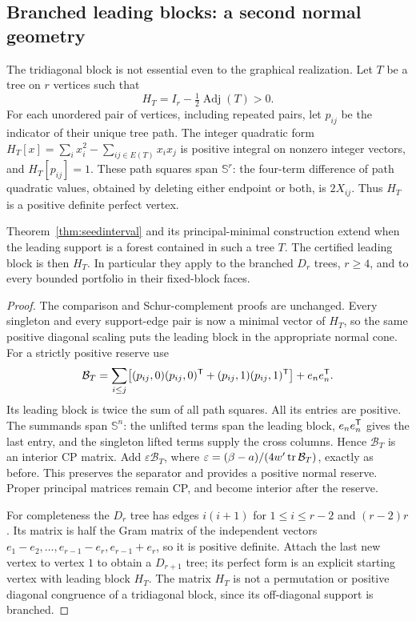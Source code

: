 \subsection{Branched leading blocks: a second normal geometry}
The tridiagonal block is not essential even to the graphical realization. Let $T$ be a tree on $r$ vertices such that
\[
 H_T=I_r-\tfrac12\operatorname{Adj}(T)>0.
\]
For each unordered pair of vertices, including repeated pairs, let $p_{ij}$ be the indicator of their unique tree path. The integer quadratic form $H_T[x]=\sum_i x_i^2-\sum_{ij\in E(T)}x_ix_j$ is positive integral on nonzero integer vectors, and $H_T[p_{ij}]=1$. These path squares span $\mathbb S^r$: the four-term difference of path quadratic values, obtained by deleting either endpoint or both, is $2X_{ij}$. Thus $H_T$ is a positive definite perfect vertex.

\begin{proposition}\label{prop:tree}
Theorem~\ref{thm:seedinterval} and its principal-minimal construction extend when the leading support is a forest contained in such a tree $T$. The certified leading block is then $H_T$. In particular they apply to the branched $D_r$ trees, $r\ge4$, and to every bounded portfolio in their fixed-block faces.
\end{proposition}
\begin{proof}
The comparison and Schur-complement proofs are unchanged. Every singleton and every support-edge pair is now a minimal vector of $H_T$, so the same positive diagonal scaling puts the leading block in the appropriate normal cone. For a strictly positive reserve use
\[
 \mathcal B_T=
 \sum_{i\le j}\bigl[(p_{ij},0)(p_{ij},0)^{\mathsf T}+
                       (p_{ij},1)(p_{ij},1)^{\mathsf T}\bigr]+e_ne_n^{\mathsf T}.
\]
Its leading block is twice the sum of all path squares. All its entries are positive. The summands span $\mathbb S^n$: the unlifted terms span the leading block, $e_ne_n^{\mathsf T}$ gives the last entry, and the singleton lifted terms supply the cross columns. Hence $\mathcal B_T$ is an interior CP matrix. Add $\varepsilon\mathcal B_T$, where $\varepsilon=(\beta-a)/(4w'\operatorname{tr}\mathcal B_T)$, exactly as before. This preserves the separator and provides a positive normal reserve. Proper principal matrices remain CP, and become interior after the reserve.

For completeness the $D_r$ tree has edges $i(i+1)$ for $1\le i\le r-2$ and $(r-2)r$. Its matrix is half the Gram matrix of the independent vectors
$e_1-e_2,\ldots,e_{r-1}-e_r,e_{r-1}+e_r$, so it is positive definite. Attach the last new vertex to vertex $1$ to obtain a $D_{r+1}$ tree; its perfect form is an explicit starting vertex with leading block $H_T$. The matrix $H_T$ is not a permutation or positive diagonal congruence of a tridiagonal block, since its off-diagonal support is branched.
\end{proof}

